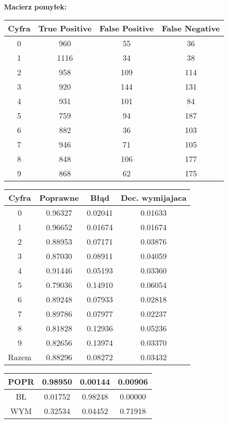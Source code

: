 \documentclass[12pt,a4paper,notitlepage]{article}
\begin{document}
\begin{center}
\textbf{Macierz pomyłek:}\\
\begin{tabular}{|c|c|c|c|}
\hline
Cyfra & True Positive & False Positive & False Negative\\\hline
      0  &  960  &   55  &   36\\\hline
      1  & 1116  &   34  &   38\\\hline
      2  &  958  &  109  &  114\\\hline
      3  &  920  &  144  &  131\\\hline
      4  &  931  &  101  &   84\\\hline
      5  &  759  &   94  &  187\\\hline
      6  &  882  &   36  &  103\\\hline
      7  &  946  &   71  &  105\\\hline
      8  &  848  &  106  &  177\\\hline
      9  &  868  &   62  &  175\\\hline
\end{tabular}
\end{center}


\begin{center}
\begin{tabular}{|c|c|c|c|}
\hline
Cyfra & Poprawne & Błąd & Dec. wymijajaca\\\hline
   0	&  0.96327  & 0.02041  &  0.01633\\\hline
   1	&  0.96652  & 0.01674  &  0.01674\\\hline
   2	&  0.88953  & 0.07171  &  0.03876\\\hline
   3	&  0.87030  & 0.08911  &  0.04059\\\hline
   4	&  0.91446  & 0.05193  &  0.03360\\\hline
   5	&  0.79036  & 0.14910  &  0.06054\\\hline
   6	&  0.89248  & 0.07933  &  0.02818\\\hline
   7	&  0.89786  & 0.07977  &  0.02237\\\hline
   8	&  0.81828  & 0.12936  &  0.05236\\\hline
   9	&  0.82656  & 0.13974  &  0.03370\\\hline
   Razem&  0.88296  & 0.08272  &  0.03432\\\hline 
\end{tabular}
\end{center}

\begin{center}
\begin{tabular}{|c|c|c|c|}
\hline
POPR & 0.98950  & 0.00144 & 0.00906\\\hline
BŁ & 0.01752  & 0.98248 & 0.00000\\\hline
WYM & 0.32534  & 0.04452 & 0.71918\\\hline  
\end{tabular}
\end{center}
\end{document}
